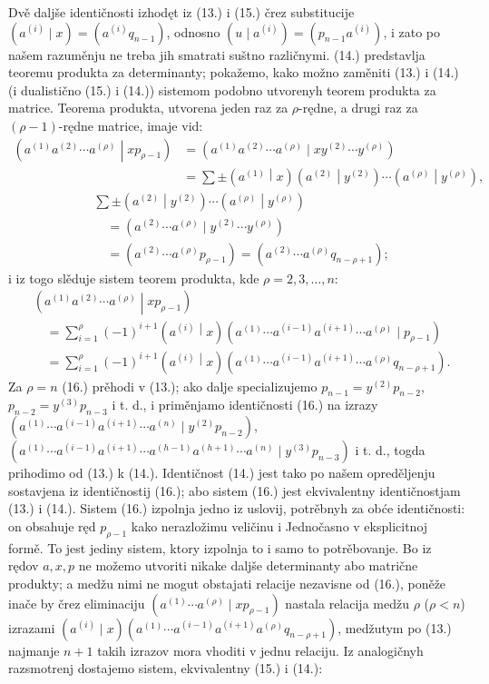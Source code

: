 \documentclass[11pt]{article}
\newcommand{\pair}[2]{\left(#1\middle|#2\right)}
\begin{document}
Dvě daljše identičnosti izhodęt iz (13.) i (15.) črez substitucije $(a^{(i)}\mid x)=(a^{(i)}q_{n-1})$, odnosno $(u\mid a^{(i)})=(p_{n-1}a^{(i)})$, i zato po našem razuměnju ne treba jih smatrati suštno različnymi. (14.) predstavlja teoremu produkta za determinanty; pokažemo, kako možno zaměniti (13.) i (14.) (i dualistično (15.) i (14.)) sistemom podobno utvorenyh teorem produkta za matrice. Teorema produkta, utvorena jeden raz za $\rho$-rędne, a drugi raz za $(\rho-1)$-rędne matrice, imaje vid:
\[
\begin{aligned}
\pair{a^{(1)}a^{(2)}\cdots a^{(\rho)}}{xp_{\rho-1}}
&=(a^{(1)}a^{(2)}\cdots a^{(\rho)}\mid xy^{(2)}\cdots y^{(\rho)})\\
&=\sum\pm\pair{a^{(1)}}{x}\pair{a^{(2)}}{y^{(2)}}\cdots\pair{a^{(\rho)}}{y^{(\rho)}},
\end{aligned}
\]
\[
\begin{aligned}
&\sum\pm\pair{a^{(2)}}{y^{(2)}}\cdots\pair{a^{(\rho)}}{y^{(\rho)}}\\
&\quad=(a^{(2)}\cdots a^{(\rho)}\mid y^{(2)}\cdots y^{(\rho)})\\
&\quad=(a^{(2)}\cdots a^{(\rho)}p_{\rho-1})
=(a^{(2)}\cdots a^{(\rho)}q_{n-\rho+1});
\end{aligned}
\]
i iz togo slěduje sistem teorem produkta, kde $\rho=2,3,\ldots,n$:
\begin{equation}
\begin{aligned}
&\pair{a^{(1)}a^{(2)}\cdots a^{(\rho)}}{xp_{\rho-1}}\\
&\quad=\sum_{i=1}^{\rho}(-1)^{i+1}\pair{a^{(i)}}{x}
(a^{(1)}\cdots a^{(i-1)}a^{(i+1)}\cdots a^{(\rho)}\mid p_{\rho-1})\\
&\quad=\sum_{i=1}^{\rho}(-1)^{i+1}\pair{a^{(i)}}{x}
(a^{(1)}\cdots a^{(i-1)}a^{(i+1)}\cdots a^{(\rho)}q_{n-\rho+1}).
\end{aligned}
\tag{16}
\end{equation}
Za $\rho=n$ (16.) prěhodi v (13.); ako dalje specializujemo $p_{n-1}=y^{(2)}p_{n-2}$, $p_{n-2}=y^{(3)}p_{n-3}$ i t. d., i priměnjamo identičnosti (16.) na izrazy $(a^{(1)}\cdots a^{(i-1)}a^{(i+1)}\cdots a^{(n)}\mid y^{(2)}p_{n-2})$, $(a^{(1)}\cdots a^{(i-1)}a^{(i+1)}\cdots a^{(h-1)}a^{(h+1)}\cdots a^{(n)}\mid y^{(3)}p_{n-3})$ i t. d., togda prihodimo od (13.) k (14.). Identičnost (14.) jest tako po našem opreděljenju sostavjena iz identičnostij (16.); abo sistem (16.) jest ekvivalentny identičnostjam (13.) i (14.). Sistem (16.) izpolnja jedno iz uslovij, potrěbnyh za obće identičnosti: on obsahuje ręd $p_{\rho-1}$ kako nerazložimu veličinu i Jednočasno v eksplicitnoj formě. To jest jediny sistem, ktory izpolnja to i samo to potrěbovanje. Bo iz rędov $a,x,p$ ne možemo utvoriti nikake daljše determinanty abo matrične produkty; a medžu nimi ne mogut obstajati relacije nezavisne od (16.), poněže inače by črez eliminaciju $(a^{(1)}\cdots a^{(\rho)}\mid xp_{\rho-1})$ nastala relacija medžu $\rho$ ($\rho<n$) izrazami $(a^{(i)}\mid x)(a^{(1)}\cdots a^{(i-1)}a^{(i+1)}a^{(\rho)}q_{n-\rho+1})$, medžutym po (13.) najmanje $n+1$ takih izrazov mora vhoditi v jednu relaciju. Iz analogičnyh razsmotrenj dostajemo sistem, ekvivalentny (15.) i (14.):
\end{document}
